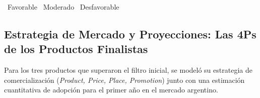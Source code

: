 \vspace{0.5cm}
\begin{table}[H]
\centering
\renewcommand{\arraystretch}{2.2}
\caption{Análisis comparativo de las 5Cs por propuesta}
\label{tab:5cs}
\end{table}

\noindent\gcircle~Favorable \quad \ycircle~Moderado \quad \rcircle~Desfavorable

\subsection{Estrategia de Mercado y Proyecciones: Las 4Ps de los Productos Finalistas}
Para los tres productos que superaron el filtro inicial, se modeló su estrategia de comercialización (\textit{Product, Price, Place, Promotion}) \autocite{catedra_4ps} junto con una estimación cuantitativa de adopción para el primer año en el mercado argentino.



